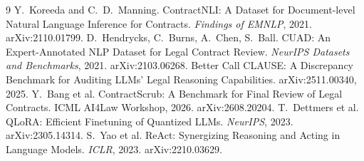 \documentclass[11pt,a4paper]{article}
\begin{document}
\vspace{-2pt}
{\small
\begin{thebibliography}{9}\setlength{\itemsep}{0pt}
 Y.~Koreeda and C.~D.~Manning. ContractNLI: A Dataset for Document-level Natural Language Inference for Contracts. \emph{Findings of EMNLP}, 2021. arXiv:2110.01799.
 D.~Hendrycks, C.~Burns, A.~Chen, S.~Ball. CUAD: An Expert-Annotated NLP Dataset for Legal Contract Review. \emph{NeurIPS Datasets and Benchmarks}, 2021. arXiv:2103.06268.
 Better Call CLAUSE: A Discrepancy Benchmark for Auditing LLMs' Legal Reasoning Capabilities. arXiv:2511.00340, 2025.
 Y.~Bang et al. ContractScrub: A Benchmark for Final Review of Legal Contracts. ICML AI4Law Workshop, 2026. arXiv:2608.20204.
 T.~Dettmers et al. QLoRA: Efficient Finetuning of Quantized LLMs. \emph{NeurIPS}, 2023. arXiv:2305.14314.
 S.~Yao et al. ReAct: Synergizing Reasoning and Acting in Language Models. \emph{ICLR}, 2023. arXiv:2210.03629.
\end{thebibliography}
}
\end{document}
